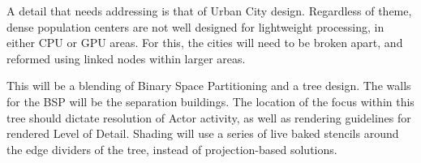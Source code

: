 A detail that needs addressing is that of Urban City design. Regardless of theme, dense population centers are not well designed for lightweight processing, in either CPU or GPU areas. For this, the cities will need to be broken apart, and reformed using linked nodes within larger areas. 

This will be a blending of Binary Space Partitioning and a tree design. The walls for the BSP will be the separation buildings. The location of the focus within this tree should dictate resolution of Actor activity, as well as rendering guidelines for rendered Level of Detail. Shading will use a series of live baked stencils around the edge dividers of the tree, instead of projection-based solutions.